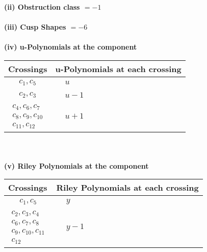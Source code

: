 \documentclass[1p]{elsarticle_modified}
\theoremstyle{definition}
\begin{document}
\flushleft \textbf{(ii) Obstruction class $= -1$}\\~\\
\flushleft \textbf{(iii) Cusp Shapes $= -6$}\\~\\
\newpage\renewcommand{\arraystretch}{1}
\flushleft \textbf{(iv) u-Polynomials at the component}\newline \\
\begin{tabular}{m{50pt}|m{274pt}}
Crossings & \hspace{64pt}u-Polynomials at each crossing \\
\hline $$\begin{aligned}c_{1},c_{5}\end{aligned}$$&$\begin{aligned}
&u
\end{aligned}$\\
\hline $$\begin{aligned}c_{2},c_{3}\end{aligned}$$&$\begin{aligned}
&u-1
\end{aligned}$\\
\hline $$\begin{aligned}c_{4},c_{6},c_{7}\\c_{8},c_{9},c_{10}\\c_{11},c_{12}\end{aligned}$$&$\begin{aligned}
&u+1
\end{aligned}$\\
\hline
\end{tabular}\\~\\
\newpage\renewcommand{\arraystretch}{1}
\flushleft \textbf{(v) Riley Polynomials at the component}\newline \\
\begin{tabular}{m{50pt}|m{274pt}}
Crossings & \hspace{64pt}Riley Polynomials at each crossing \\
\hline $$\begin{aligned}c_{1},c_{5}\end{aligned}$$&$\begin{aligned}
&y
\end{aligned}$\\
\hline $$\begin{aligned}c_{2},c_{3},c_{4}\\c_{6},c_{7},c_{8}\\c_{9},c_{10},c_{11}\\c_{12}\end{aligned}$$&$\begin{aligned}
&y-1
\end{aligned}$\\
\hline
\end{tabular}\\~\\
\end{document}
